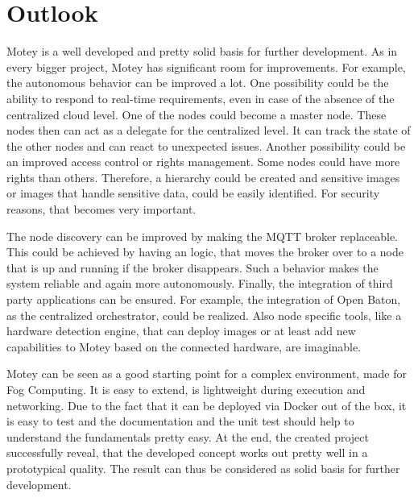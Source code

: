 



\section{Outlook}
Motey is a well developed and pretty solid basis for further development.
As in every bigger project, Motey has significant room for improvements.
For example, the autonomous behavior can be improved a lot.
One possibility could be the ability to respond to real-time requirements, even in case of the absence of the centralized cloud level.
One of the nodes could become a master node.
These nodes then can act as a delegate for the centralized level.
It can track the state of the other nodes and can react to unexpected issues.
Another possibility could be an improved access control or rights management.
Some nodes could have more rights than others.
Therefore, a hierarchy could be created and sensitive images or images that handle sensitive data, could be easily identified.
For security reasons, that becomes very important.\newline

The node discovery can be improved by making the \ac{MQTT} broker replaceable.
This could be achieved by having an logic, that moves the broker over to a node that is up and running if the broker disappears.
Such a behavior makes the system reliable and again more autonomously.
Finally, the integration of third party applications can be ensured.
For example, the integration of Open Baton, as the centralized orchestrator, could be realized.
Also node specific tools, like a hardware detection engine, that can deploy images or at least add new capabilities to Motey based on the connected hardware, are imaginable.\newline

Motey can be seen as a good starting point for a complex environment, made for Fog Computing.
It is easy to extend, is lightweight during execution and networking.
Due to the fact that it can be deployed via Docker out of the box, it is easy to test and the documentation and the unit test should help to understand the fundamentals pretty easy.
At the end, the created project successfully reveal, that the developed concept works out pretty well in a prototypical quality.
The result can thus be considered as solid basis for further development.
